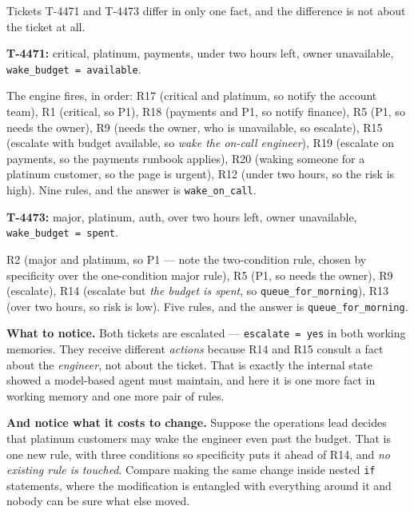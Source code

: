 \begin{worked}
Tickets T-4471 and T-4473 differ in only one fact, and the difference is not about
the ticket at all.

\smallskip
\textbf{T-4471:} critical, platinum, payments, under two hours left, owner
unavailable, \texttt{wake\_budget = available}.

\smallskip
The engine fires, in order: R17 (critical and platinum, so notify the account team),
R1 (critical, so P1), R18 (payments and P1, so notify finance), R5 (P1, so needs the
owner), R9 (needs the owner, who is unavailable, so escalate), R15 (escalate with
budget available, so \emph{wake the on-call engineer}), R19 (escalate on payments,
so the payments runbook applies), R20 (waking someone for a platinum customer, so
the page is urgent), R12 (under two hours, so the risk is high). Nine rules, and
the answer is \texttt{wake\_on\_call}.

\smallskip
\textbf{T-4473:} major, platinum, auth, over two hours left, owner unavailable,
\texttt{wake\_budget = spent}.

\smallskip
R2 (major and platinum, so P1 --- note the two-condition rule, chosen by
specificity over the one-condition major rule), R5 (P1, so needs the owner), R9
(escalate), R14 (escalate but \emph{the budget is spent}, so
\texttt{queue\_for\_morning}), R13 (over two hours, so risk is low). Five rules, and
the answer is \texttt{queue\_for\_morning}.

\smallskip
\textbf{What to notice.} Both tickets are escalated --- \texttt{escalate = yes} in
both working memories. They receive different \emph{actions} because R14 and R15
consult a fact about the \emph{engineer}, not about the ticket. That is exactly the
internal state  showed a model-based agent must maintain, and here it
is one more fact in working memory and one more pair of rules.

\smallskip
\textbf{And notice what it costs to change.} Suppose the operations lead decides
that platinum customers may wake the engineer even past the budget. That is one new
rule, with three conditions so specificity puts it ahead of R14, and \emph{no
existing rule is touched}. Compare making the same change inside nested
\texttt{if} statements, where the modification is entangled with everything around
it and nobody can be sure what else moved.
\end{worked}

